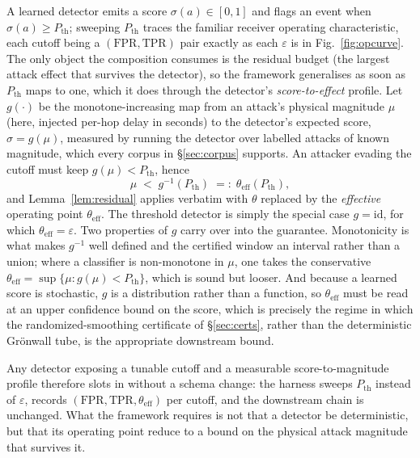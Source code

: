 A learned detector emits a score $\sigma(a)\in[0,1]$ and flags an event when
$\sigma(a)\ge P_{\mathrm{th}}$; sweeping $P_{\mathrm{th}}$ traces the familiar
receiver operating characteristic, each cutoff being a
$(\mathrm{FPR},\mathrm{TPR})$ pair exactly as each $\varepsilon$ is in
Fig.~\ref{fig:opcurve}. The only object the composition consumes is the residual
budget (the largest attack effect that survives the detector), so the framework
generalises as soon as $P_{\mathrm{th}}$ maps to one, which it does through the
detector's \emph{score-to-effect} profile. Let $g(\cdot)$ be the
monotone-increasing map from an attack's physical magnitude $\mu$ (here,
injected per-hop delay in seconds) to the detector's expected score,
$\sigma=g(\mu)$, measured by running the detector over labelled attacks of known
magnitude, which every corpus in \S\ref{sec:corpus} supports. An attacker
evading the cutoff must keep $g(\mu)<P_{\mathrm{th}}$, hence
\begin{equation}
\label{eq:pth}
\mu \;<\; g^{-1}(P_{\mathrm{th}}) \;=:\; \theta_{\mathrm{eff}}(P_{\mathrm{th}}),
\end{equation}
and Lemma~\ref{lem:residual} applies verbatim with $\theta$ replaced by the
\emph{effective} operating point $\theta_{\mathrm{eff}}$. The threshold detector
is simply the special case $g=\mathrm{id}$, for which
$\theta_{\mathrm{eff}}=\varepsilon$. Two properties of $g$ carry over into the
guarantee. Monotonicity is what makes $g^{-1}$ well defined and the certified
window an interval rather than a union; where a classifier is non-monotone in
$\mu$, one takes the conservative
$\theta_{\mathrm{eff}}=\sup\{\mu: g(\mu)<P_{\mathrm{th}}\}$, which is sound but
looser. And because a learned score is stochastic, $g$ is a distribution rather
than a function, so $\theta_{\mathrm{eff}}$ must be read at an upper confidence
bound on the score, which is precisely the regime in which the
randomized-smoothing certificate of \S\ref{sec:certs}, rather than the
deterministic Gr\"onwall tube, is the appropriate downstream bound.

Any detector exposing a tunable cutoff and a measurable score-to-magnitude
profile therefore slots in without a schema change: the harness sweeps
$P_{\mathrm{th}}$ instead of $\varepsilon$, records
$(\mathrm{FPR},\mathrm{TPR},\theta_{\mathrm{eff}})$ per cutoff, and the
downstream chain is unchanged. What the framework requires is not that a
detector be deterministic, but that its operating point reduce to a bound on the
physical attack magnitude that survives it.

